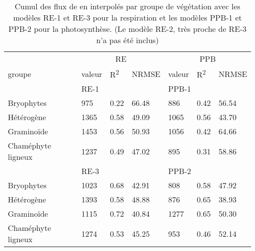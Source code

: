 
\begin{table}
\centering
\caption{Cumul des flux de \coo en \si{\gcma} interpolés par groupe de végétation avec les modèles RE-1 et RE-3 pour la respiration et les modèles PPB-1 et PPB-2 pour la photosynthèse. (Le modèle RE-2, très proche de RE-3 n'a pas été inclus)}
\label{table:flux_grp}
\begin{tabular}{lllllll}\toprule
& \multicolumn{3}{c}{RE} &  \multicolumn{3}{c}{PPB} \\ \cmidrule(lr){2-4} \cmidrule(lr){5-7} 
groupe & valeur & R\textsuperscript{2} & NRMSE & valeur & R\textsuperscript{2} & NRMSE\\ \midrule
& \multicolumn{3}{l}{RE-1} &  \multicolumn{3}{l}{PPB-1} \\
Bryophytes &  \num{975} & \num{0.22} & \num{66.48} & \num{886} & \num{0.42} & \num{56.54} \\
Hétérogène &  \num{1365} & \num{0.58} & \num{49.09} & \num{1065} & \num{0.56} & \num{43.70}  \\
Graminoïde &  \num{1453} & \num{0.56} & \num{50.93}  & \num{1056} & \num{0.42} & \num{64.66} \\
Chaméphyte ligneux &  \num{1237} & \num{0.49} & \num{47.02} & \num{895} & \num{0.31} & \num{58.86}  \\ [+1ex]
& \multicolumn{3}{l}{RE-3} &  \multicolumn{3}{l}{PPB-2} \\
Bryophytes &  \num{1023} & \num{0.68} & \num{42.91} & \num{808} & \num{0.58} & \num{47.92} \\
Hétérogène &  \num{1393} & \num{0.58} & \num{48.88} & \num{876} & \num{0.65} & \num{38.93}  \\
Graminoïde &  \num{1115} & \num{0.72} & \num{40.84}  & \num{1277} & \num{0.65} & \num{50.30} \\
Chaméphyte ligneux &  \num{1274} & \num{0.53} & \num{45.25} & \num{953} & \num{0.46} & \num{52.14}  \\
\bottomrule
\end{tabular}
\end{table}

